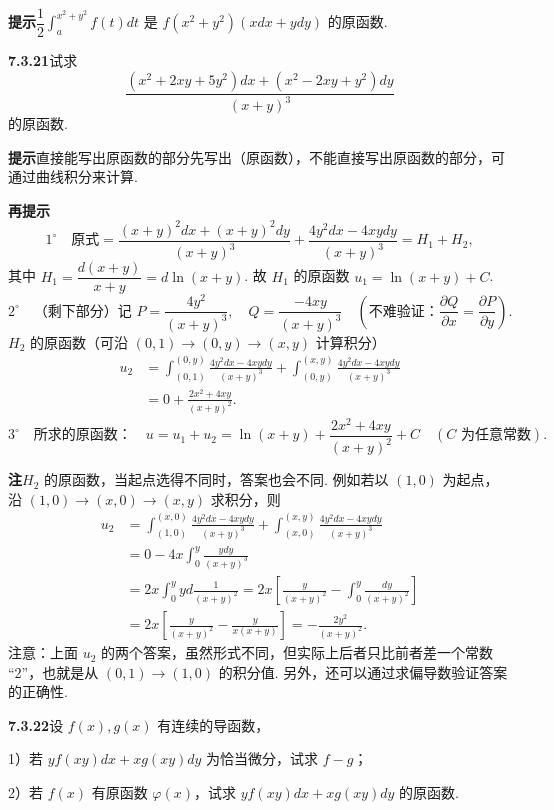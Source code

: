 \documentclass[UTF8,12pt,a4paper,fontset=fandol]{ctexart}
\begin{document}
\noindent\textbf{提示}\quad $\dfrac12\displaystyle\int_a^{x^2+y^2}f(t)dt$ 是 $f(x^2+y^2)(xdx+ydy)$ 的原函数.

\noindent\textbf{7.3.21}\quad 试求
\[
\frac{(x^2+2xy+5y^2)dx+(x^2-2xy+y^2)dy}{(x+y)^3}
\]
的原函数.

\noindent\textbf{提示}\quad 直接能写出原函数的部分先写出（原函数），不能直接写出原函数的部分，可通过曲线积分来计算.

\noindent\textbf{再提示}\quad
\[
1^\circ\quad
\text{原式}=
\frac{(x+y)^2dx+(x+y)^2dy}{(x+y)^3}
+\frac{4y^2dx-4xydy}{(x+y)^3}=H_1+H_2,
\]
其中 $H_1=\dfrac{d(x+y)}{x+y}=d\ln(x+y)$. 故 $H_1$ 的原函数 $u_1=\ln(x+y)+C$.
\[
2^\circ\quad
\text{（剩下部分）记 }P=\frac{4y^2}{(x+y)^3},\quad
Q=\frac{-4xy}{(x+y)^3}\quad
\left(\text{不难验证：}\frac{\partial Q}{\partial x}=\frac{\partial P}{\partial y}\right).
\]
$H_2$ 的原函数（可沿 $(0,1)\to(0,y)\to(x,y)$ 计算积分）
\[
\begin{aligned}
u_2&=\int_{(0,1)}^{(0,y)}\frac{4y^2dx-4xydy}{(x+y)^3}
+\int_{(0,y)}^{(x,y)}\frac{4y^2dx-4xydy}{(x+y)^3}\\
&=0+\frac{2x^2+4xy}{(x+y)^2}.
\end{aligned}
\]
\[
3^\circ\quad
\text{所求的原函数：}\quad
u=u_1+u_2=\ln(x+y)+\frac{2x^2+4xy}{(x+y)^2}+C
\quad(C\text{ 为任意常数}).
\]

\noindent\textbf{注}\quad $H_2$ 的原函数，当起点选得不同时，答案也会不同. 例如若以 $(1,0)$ 为起点，沿 $(1,0)\to(x,0)\to(x,y)$ 求积分，则
\[
\begin{aligned}
u_2&=\int_{(1,0)}^{(x,0)}\frac{4y^2dx-4xydy}{(x+y)^3}
+\int_{(x,0)}^{(x,y)}\frac{4y^2dx-4xydy}{(x+y)^3}\\
&=0-4x\int_0^y\frac{ydy}{(x+y)^3}\\
&=2x\int_0^yyd\frac1{(x+y)^2}
=2x\left[\frac y{(x+y)^2}-\int_0^y\frac{dy}{(x+y)^2}\right]\\
&=2x\left[\frac y{(x+y)^2}-\frac y{x(x+y)}\right]
=-\frac{2y^2}{(x+y)^2}.
\end{aligned}
\]
注意：上面 $u_2$ 的两个答案，虽然形式不同，但实际上后者只比前者差一个常数 “2”，也就是从 $(0,1)\to(1,0)$ 的积分值. 另外，还可以通过求偏导数验证答案的正确性.

\noindent\textbf{7.3.22}\quad 设 $f(x),g(x)$ 有连续的导函数，

1）若 $yf(xy)dx+xg(xy)dy$ 为恰当微分，试求 $f-g$；

2）若 $f(x)$ 有原函数 $\varphi(x)$，试求 $yf(xy)dx+xg(xy)dy$ 的原函数.
\end{document}
